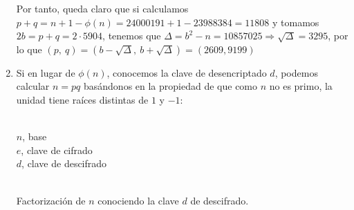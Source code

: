 \begin{enumerate}
		Por tanto, queda claro que si calculamos $p+q = n+1-\phi(n) = 24000191+1-23988384 = 11808$ y tomamos $2b = p+q =
		2 \cdot 5904$, tenemos que $\Delta = b^2-n = 10857025 \Rightarrow \sqrt{\Delta} = 3295$, por lo que $(p,\ q) =
		\left(b-\sqrt{\Delta},\ b+\sqrt{\Delta}\right) = (2609, 9199)$
		
		\item Si en lugar de $\phi(n)$, conocemos la clave de desencriptado $d$, podemos calcular $n = pq$ basándonos
		en la propiedad de que como $n$ no es primo, la unidad tiene raíces distintas de $1$ y $-1$:
		
		\begin{algorithm}[H]
			\begin{algorithmic}[1]
				\REQUIRE \ \\
					\texttt{$n$}, base\\
					\texttt{$e$}, clave de cifrado\\
					\texttt{$d$}, clave de descifrado\\ \
					\WHILE{\texttt{$g \in \{1, n\}$ \AND $k \equiv 0 \mod 2$}}
					\ENDWHILE
				\ENDWHILE
				
			\end{algorithmic}
			\caption{Factorización de $n$ conociendo la clave $d$ de descifrado.}
			\label{AtaqueD}
		\end{algorithm}
		
	\end{enumerate}
